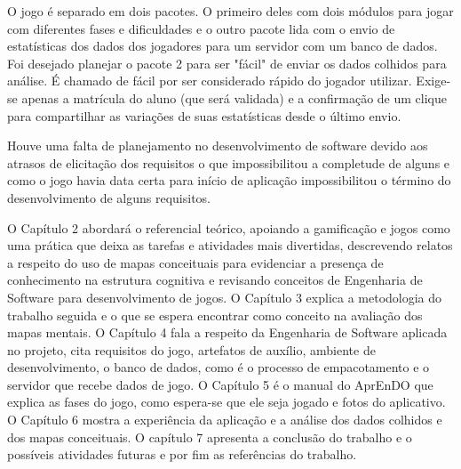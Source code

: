 O jogo é separado em dois pacotes. O primeiro deles com dois módulos para jogar com diferentes fases e dificuldades e o outro pacote lida com o envio de estatísticas dos dados dos jogadores para um servidor com um banco de dados. Foi desejado planejar o pacote 2 para ser "fácil" de enviar os dados colhidos para análise. É chamado de fácil por ser considerado rápido do jogador utilizar. Exige-se apenas a matrícula do aluno (que será validada) e a confirmação de um clique para compartilhar as variações de suas estatísticas desde o último envio.

Houve uma falta de planejamento no desenvolvimento de software devido aos atrasos de elicitação dos requisitos o que impossibilitou a completude de alguns e como o jogo havia data certa para início de aplicação impossibilitou o término do desenvolvimento de alguns requisitos. 

O Capítulo 2 abordará o referencial teórico, apoiando a gamificação e jogos como uma prática que deixa as tarefas e atividades mais divertidas, descrevendo relatos a respeito do uso de mapas conceituais para evidenciar a presença de conhecimento na estrutura cognitiva e revisando conceitos de Engenharia de Software para desenvolvimento de jogos.
O Capítulo 3 explica a metodologia do trabalho seguida e o que se espera encontrar como conceito na avaliação dos mapas mentais. O Capítulo 4 fala a respeito da Engenharia de Software aplicada no projeto, cita requisitos do jogo, artefatos de auxílio, ambiente de desenvolvimento, o banco de dados, como é o processo de empacotamento e o servidor que recebe dados de jogo. O Capítulo 5 é o manual do AprEnDO que explica as fases do jogo, como espera-se que ele seja jogado e fotos do aplicativo. O Capítulo 6 mostra a experiência da aplicação e a análise dos dados colhidos e dos mapas conceituais. O capítulo 7 apresenta a conclusão do trabalho e o possíveis atividades futuras e por fim as referências do trabalho.
